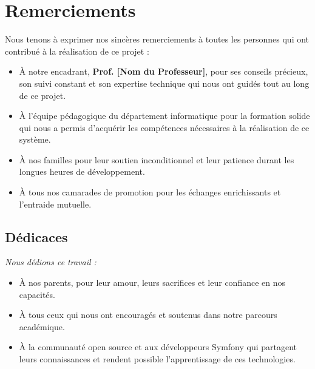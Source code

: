 \documentclass[12pt,a4paper]{article}
\begin{document}
\newpage
\chapter*{Remerciements}

Nous tenons à exprimer nos sincères remerciements à toutes les personnes qui ont contribué à la réalisation de ce projet :

\begin{itemize}
    \item À notre encadrant, \textbf{Prof. [Nom du Professeur]}, pour ses conseils précieux, son suivi constant et son expertise technique qui nous ont guidés tout au long de ce projet.
    
    \item À l'équipe pédagogique du département informatique pour la formation solide qui nous a permis d'acquérir les compétences nécessaires à la réalisation de ce système.
    
    \item À nos familles pour leur soutien inconditionnel et leur patience durant les longues heures de développement.
    
    \item À tous nos camarades de promotion pour les échanges enrichissants et l'entraide mutuelle.
\end{itemize}

\vspace{2cm}

\section*{Dédicaces}

\textit{Nous dédions ce travail :}

\begin{itemize}
    \item À nos parents, pour leur amour, leurs sacrifices et leur confiance en nos capacités.
    
    \item À tous ceux qui nous ont encouragés et soutenus dans notre parcours académique.
    
    \item À la communauté open source et aux développeurs Symfony qui partagent leurs connaissances et rendent possible l'apprentissage de ces technologies.
\end{itemize}
\end{document}
